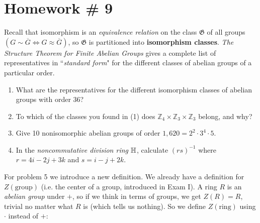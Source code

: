 \section{Homework \# 9}
\label{sec:HW9}

Recall that isomorphism is an \textit{equivalence relation} on the class \( \mathfrak{G} \) of all groups \(( G \sim \overline{G} \iff G \approx \overline{G} )\),  
so \( \mathfrak{G} \) is partitioned into \textbf{isomorphism classes}.  
\textit{The Structure Theorem for Finite Abelian Groups} gives a complete list of representatives in ``\textit{standard form}"  
for the different classes of abelian groups of a particular order. \\ \steezybreak


\begin{enumerate}
    \item What are the representatives for the different isomorphism classes of abelian groups with order 36? \\ \steezybreak
    
    \item To which of the classes you found in (1) does \( \mathbb{Z}_4 \times \mathbb{Z}_3 \times \mathbb{Z}_3 \) belong, and why? \\ \steezybreak

    \item Give 10 nonisomorphic abelian groups of order \( 1,620 = 2^2 \cdot 3^4 \cdot 5 \). \\ \steezybreak

    \item In the \textit{noncommutative division ring} \( {\mathbb{ H}} \), calculate \( (rs)^{-1} \)  
    where \( r = 4i - 2j + 3k \) and \( s = i - j + 2k \). \\ \steezybreak
\end{enumerate}
\vspace{0.1in}
\begin{tcolorbox}
    For problem 5 we introduce a new definition. We already have a definition for \( Z(\text{group}) \) (i.e. the center of a group, introduced in Exam I).  
    A ring \( R \) is an \textit{abelian group} under \( + \), so if we think in terms of groups,  
    we get \( Z(R) = R \), trivial no matter what \( R \) is (which tells us nothing).  So we define \( Z(\text{ring}) \) using \( \cdot \) instead of \( + \):
\end{tcolorbox}

